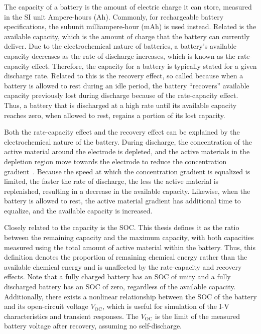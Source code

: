 \documentclass[../zhang_thesis.tex]{subfiles}
\begin{document}
The capacity of a battery is the amount of electric charge it can store, measured in the SI unit Ampere-hours (Ah). Commonly, for rechargeable battery specifications, the subunit milliampere-hour (mAh) is used instead. Related is the available capacity, which is the amount of charge that the battery can currently deliver. Due to the electrochemical nature of batteries, a battery's available capacity decreases as the rate of discharge increases, which is known as the rate-capacity effect. Therefore, the capacity for a
battery is typically stated for a given discharge rate.  Related to this is the recovery effect, so called because when a battery is allowed to rest during an idle period, the battery ``recovers'' available capacity previously lost during discharge because of the rate-capacity effect. Thus, a battery that is discharged at a high rate until its available capacity reaches zero, when allowed to rest, regains a portion of its lost capacity.

Both the rate-capacity effect and the recovery effect can be explained by the electrochemical nature of the battery. During discharge, the concentration of the active material around the electrode is depleted, and the active materials in the depletion region move towards the electrode to reduce the concentration gradient~\cite{chiasserini99}. Because the speed at which the concentration gradient is equalized is limited, the faster the rate of discharge, the less the active material is
replenished, resulting in a decrease in the available capacity. Likewise, when the battery is allowed to rest, the active material gradient has additional time to equalize, and the available capacity is increased.

Closely related to the capacity is the SOC. This thesis defines it as the ratio between the remaining capacity and the maximum capacity, with both capacities measured using the total amount of active material within the battery. Thus, this definition denotes the proportion of remaining chemical energy rather than the available chemical energy and is unaffected by the rate-capacity and recovery effects. Note that a fully charged battery has an SOC of unity and a fully discharged battery has an SOC of zero, regardless
of the available capacity. Additionally, there exists a nonlinear relationship between the SOC of the battery and its open-circuit voltage $V_\text{OC}$, which is useful for simulation of the I-V characteristics and transient responses. The $V_\text{OC}$ is the limit of the measured battery voltage after recovery, assuming no self-discharge.
\end{document}
